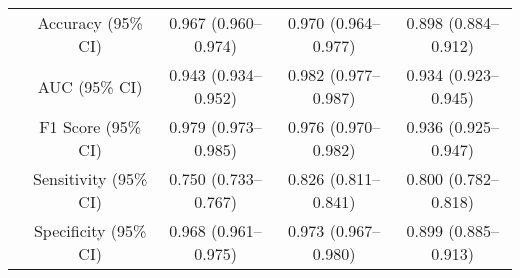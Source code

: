 \begin{table}[h]
\begin{tabular}{cc|c|c|c}
 \rowcolor{cusyellowl}   \multirow{1}{*}{HSIL+}&Accuracy (95\% CI) & 0.967 (0.960–0.974) & 0.970 (0.964–0.977) & 0.898 (0.884–0.912)  \\
 \rowcolor{cusyellowl}  & AUC (95\% CI) & 0.943 (0.934–0.952) & 0.982 (0.977–0.987) & 0.934 (0.923–0.945) \\
 \rowcolor{cusyellowl}  & F1 Score (95\% CI)  & 0.979 (0.973–0.985) & 0.976 (0.970–0.982) & 0.936 (0.925–0.947) \\
 \rowcolor{cusyellowl}  & Sensitivity (95\% CI) & 0.750 (0.733–0.767) & 0.826 (0.811–0.841) & 0.800 (0.782–0.818)\\
 \rowcolor{cusyellowl}  & Specificity (95\% CI) & 0.968 (0.961–0.975) & 0.973 (0.967–0.980) & 0.899 (0.885–0.913)\\
\hline
\end{tabular} 
\label{ST_wsi}
\end{table}



